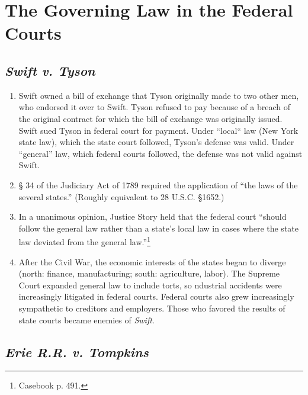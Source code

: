 \section{The Governing Law in the Federal Courts}

\subsection{\emph{Swift v. Tyson}}

\begin{enumerate}
    \item Swift owned a bill of exchange that Tyson originally made to two other men, who endorsed it over to Swift. Tyson refused to pay because of a breach of the original contract for which the bill of exchange was originally issued. Swift sued Tyson in federal court for payment. Under ``local`` law (New York state law), which the state court followed, Tyson's defense was valid. Under ``general'' law, which federal courts followed, the defense was not valid against Swift.
    \item § 34 of the Judiciary Act of 1789 required the application of ``the laws of the several states.'' (Roughly equivalent to 28 U.S.C. §1652.)
    \item In a unanimous opinion, Justice Story held that the federal court ``should follow the general law rather than a state's local law in cases where the state law deviated from the general law.''\footnote{Casebook p. 491.}
    \item After the Civil War, the economic interests of the states began to diverge (north: finance, manufacturing; south: agriculture, labor). The Supreme Court expanded general law to include torts, so ndustrial accidents were increasingly litigated in federal courts. Federal courts also grew increasingly sympathetic to creditors and employers. Those who favored the results of state courts became enemies of \emph{Swift}.
\end{enumerate}

\subsection{\emph{Erie R.R. v. Tompkins}}

